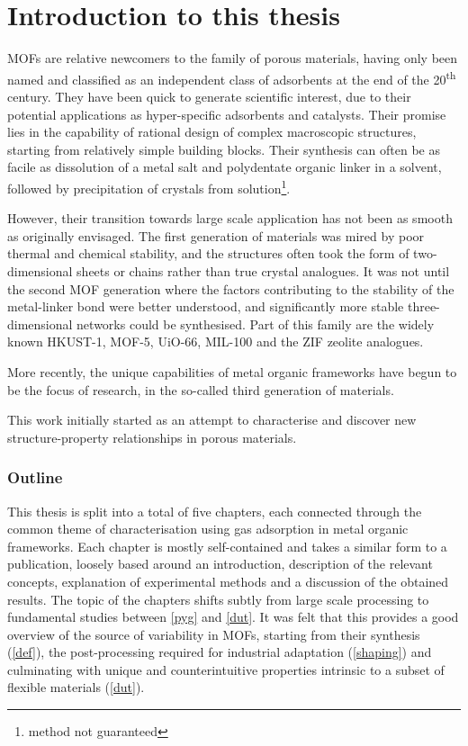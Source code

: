 
\graphicspath{ {\thisch/figures/} }

\chapter*{Introduction to this thesis}\label{intro}

MOFs are relative newcomers to the family of porous materials,
having only been named and classified as an independent class
of adsorbents at the end of the 20\textsuperscript{th} century.
They have been quick to generate scientific interest, due to their
potential applications as hyper-specific adsorbents and catalysts.
Their promise lies in the capability of rational design of 
complex macroscopic structures, starting from relatively simple building
blocks. Their synthesis can often be as facile as dissolution 
of a metal salt and polydentate organic linker in a solvent, followed
by precipitation of crystals from solution\footnote{method not guaranteed}.

However, their transition towards large scale application has not been
as smooth as originally envisaged. The first generation of materials
was mired by poor thermal and chemical stability, and the structures 
often took the form of two-dimensional sheets or chains rather than
true crystal analogues. It was not until the second MOF generation 
where the factors contributing to the stability of the metal-linker
bond were better understood, and significantly more stable three-dimensional
networks could be synthesised.
Part of this family are the widely known HKUST-1, MOF-5, UiO-66, MIL-100
and the ZIF zeolite analogues.

More recently, the unique capabilities of metal organic frameworks
have begun to be the focus of research, in the so-called third 
generation of materials. 


This work initially started as an attempt to characterise and discover 
new structure-property relationships in porous materials. 

\subsection*{Outline}

This thesis is split into a total of five chapters, each
connected through the common theme of characterisation 
using gas adsorption in metal organic frameworks. 
Each chapter is mostly 
self-contained and takes a similar form to a publication,
loosely based around an introduction, description of the 
relevant concepts, explanation of experimental methods and
a discussion of the obtained results. The topic of the chapters 
shifts subtly from large scale processing to fundamental
studies between \autoref{pyg} and \autoref{dut}. It was felt 
that this provides a good overview of the source of 
variability in MOFs, starting from their synthesis
(\autoref{def}), the post-processing required for industrial
adaptation (\autoref{shaping}) and culminating with 
unique and counterintuitive properties intrinsic to a subset 
of flexible materials (\autoref{dut}).

